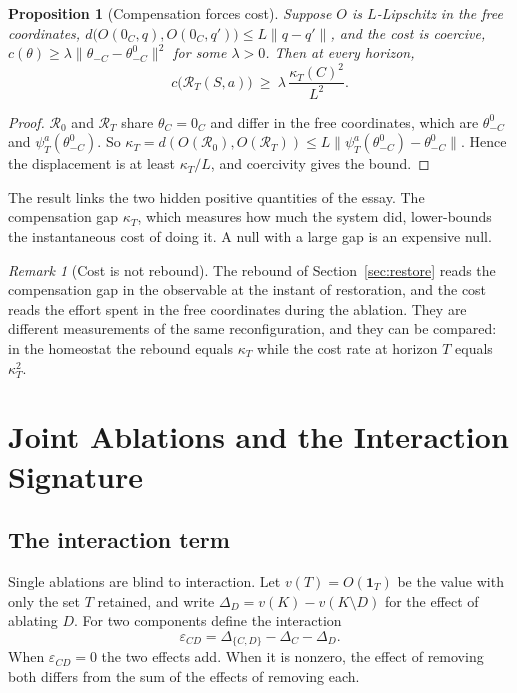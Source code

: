 \documentclass[11pt]{article}
\newtheorem{proposition}[theorem]{Proposition}
\theoremstyle{definition}
\theoremstyle{remark}
\newtheorem{remark}[theorem]{Remark}
\newcommand{\Rop}{\mathcal{R}}
\begin{document}
\begin{proposition}[Compensation forces cost]\label{prop:forced}
Suppose $O$ is $L$-Lipschitz in the free coordinates, $d\bigl(O(0_C,q),O(0_C,q')\bigr)\le L\|q-q'\|$, and the cost is coercive, $c(\theta)\ge\lambda\|\theta_{-C}-\theta^0_{-C}\|^2$ for some $\lambda>0$. Then at every horizon,
\[
c\bigl(\Rop_T(S,a)\bigr)\ \ge\ \lambda\,\frac{\kappa_T(C)^2}{L^2}.
\]
\end{proposition}
\begin{proof}
$\Rop_0$ and $\Rop_T$ share $\theta_C=0_C$ and differ in the free coordinates, which are $\theta^0_{-C}$ and $\psi^a_T(\theta^0_{-C})$. So $\kappa_T=d(O(\Rop_0),O(\Rop_T))\le L\|\psi^a_T(\theta^0_{-C})-\theta^0_{-C}\|$. Hence the displacement is at least $\kappa_T/L$, and coercivity gives the bound.
\end{proof}

The result links the two hidden positive quantities of the essay. The compensation gap $\kappa_T$, which measures how much the system did, lower-bounds the instantaneous cost of doing it. A null with a large gap is an expensive null.

\begin{remark}[Cost is not rebound]
The rebound of Section~\ref{sec:restore} reads the compensation gap in the observable at the instant of restoration, and the cost reads the effort spent in the free coordinates during the ablation. They are different measurements of the same reconfiguration, and they can be compared: in the homeostat the rebound equals $\kappa_T$ while the cost rate at horizon $T$ equals $\kappa_T^2$.
\end{remark}

\section{Joint Ablations and the Interaction Signature}\label{sec:joint}

\subsection{The interaction term}

Single ablations are blind to interaction. Let $v(T)=O(\mathbf 1_T)$ be the value with only the set $T$ retained, and write $\Delta_D=v(K)-v(K\setminus D)$ for the effect of ablating $D$. For two components define the interaction
\begin{equation}\label{eq:interaction}
\varepsilon_{CD}=\Delta_{\{C,D\}}-\Delta_{C}-\Delta_{D}.
\end{equation}
When $\varepsilon_{CD}=0$ the two effects add. When it is nonzero, the effect of removing both differs from the sum of the effects of removing each.
\end{document}
